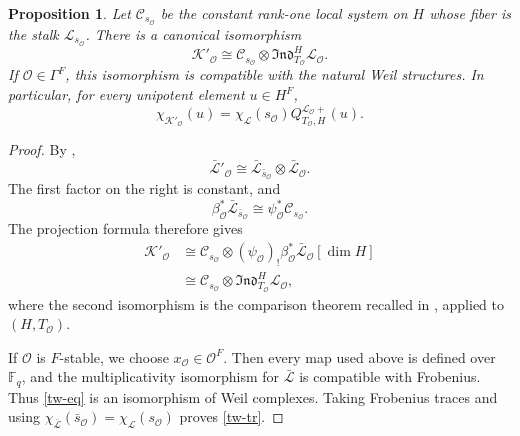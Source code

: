 \documentclass[11pt,letterpaper]{amsart}
\newtheorem{proposition}[theorem]{Proposition}
\theoremstyle{definition}
\numberwithin{equation}{section}
\numberwithin{theorem}{section}
\begin{document}
\begin{proposition}\label{tw}
Let $\mathcal C_{s_{\mathcal O}}$ be the constant rank-one local system
on $H$ whose fiber is the stalk $\mathcal L_{s_{\mathcal O}}$. There is
a canonical isomorphism
\begin{equation}\label{tw-eq}
 \mathcal K'_{\mathcal O}
 \cong
 \mathcal C_{s_{\mathcal O}}\otimes
 \mathfrak{Ind}^{H}_{T_{\mathcal O}}\mathcal L_{\mathcal O}.
\end{equation}
If $\mathcal O\in\Gamma^F$, this isomorphism is compatible with the
natural Weil structures. In particular, for every unipotent element
$u\in H^F$,
\begin{equation}\label{tw-tr}
 \chi_{\mathcal K'_{\mathcal O}}(u)
 =\chi_{\mathcal L}(s_{\mathcal O})
  Q_{T_{\mathcal O},H}^{\mathcal L_{\mathcal O}+}(u).
\end{equation}
\end{proposition}
\begin{proof}
By ,
\[
 \bar{\mathcal L}'_{\mathcal O}
 \cong
 \bar{\mathcal L}_{\bar s_{\mathcal O}}
 \otimes\bar{\mathcal L}_{\mathcal O}.
\]
The first factor on the right is constant, and
\[
 \beta_{\mathcal O}^*\bar{\mathcal L}_{\bar s_{\mathcal O}}
 \cong\psi_{\mathcal O}^*\mathcal C_{s_{\mathcal O}}.
\]
The projection formula therefore gives
\begin{align*}
 \mathcal K'_{\mathcal O}
 &\cong
 \mathcal C_{s_{\mathcal O}}\otimes
 ({\psi_{\mathcal O}})_!
 \beta_{\mathcal O}^*\bar{\mathcal L}_{\mathcal O}[\dim H]\\
 &\cong
 \mathcal C_{s_{\mathcal O}}\otimes
 \mathfrak{Ind}^{H}_{T_{\mathcal O}}\mathcal L_{\mathcal O},
\end{align*}
where the second isomorphism is the comparison theorem recalled in
, applied to $(H,T_{\mathcal O})$.

If $\mathcal O$ is $F$-stable, we choose $x_{\mathcal O}\in\mathcal O^F$.
Then every map used above is defined over $\mathbb F_q$, and the
multiplicativity isomorphism for $\bar{\mathcal L}$ is compatible with
Frobenius. Thus \eqref{tw-eq} is an isomorphism of Weil
complexes. Taking Frobenius traces and using
$\chi_{\bar{\mathcal L}}(\bar s_{\mathcal O})
=\chi_{\mathcal L}(s_{\mathcal O})$ proves
\eqref{tw-tr}.
\end{proof}
\end{document}
